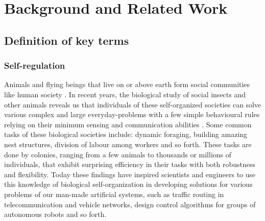 \chapter{Background and Related Work}
\label{bg}
\section{Definition of key terms}
\subsection{Self-regulation}
Animals and flying beings that live on or above earth form social communities like human society \cite{SIHQ1995}. In recent years, the biological study of social insects and other animals reveals 
us that individuals of these self-organized  societies can solve various complex and large everyday-problems with a few simple behavioural rules relying on their minimum sensing and communication abilities \cite{Garnier+2007,Camazine+2001}. Some common tasks of these biological societies include: dynamic foraging, building amazing nest structures, division of labour among workers and so forth. These tasks are done by colonies,  ranging from a few animals to thousands or millions of individuals, that exhibit surprising efficiency in their tasks with both robustness and flexibility. Today these findings have inspired scientists and engineers to use this knowledge of biological self-organization in developing solutions for various problems of our man-made artificial systems, such as traffic routing in telecommunication and vehicle networks, design control algorithms for groups of autonomous robots and so forth.

